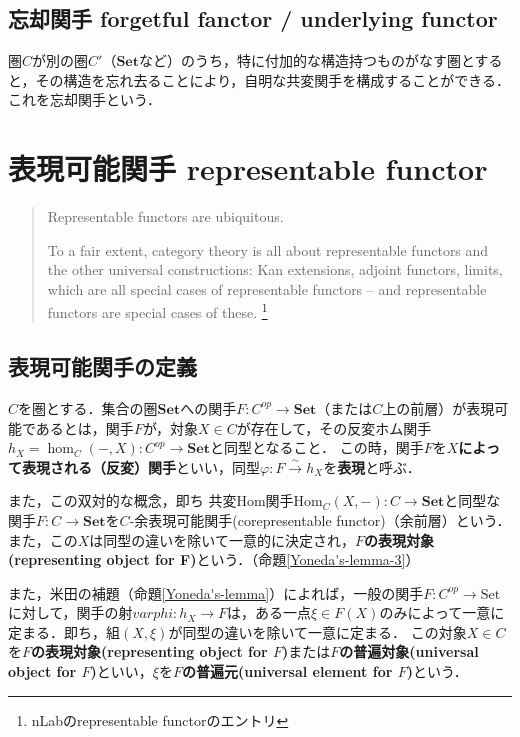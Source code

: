 \documentclass[uplatex, 12pt, dvipdfmx]{jsreport}
\begin{document}
\subsection{忘却関手 forgetful fanctor / underlying functor}
圏$C$が別の圏$C'$（$\mathbf{Set}$など）のうち，特に付加的な構造持つものがなす圏とすると，その構造を忘れ去ることにより，自明な共変関手を構成することができる．これを忘却関手という．

\section{表現可能関手 representable functor}
\begin{quotation}
    Representable functors are ubiquitous.
    
    To a fair extent, category theory is all about representable functors and the other universal constructions: Kan extensions, adjoint functors, limits, which are all special cases of representable functors – and representable functors are special cases of these.
    \footnote{nLabのrepresentable functorのエントリ}
\end{quotation}
\subsection{表現可能関手の定義}
\begin{shadebox}\begin{definition}[表現可能関手]\label{def-representable functor}
    $C$を圏とする．集合の圏$\mathbf{Set}$への関手$F:C^{op}\to\mathbf{Set}$（または$C$上の前層）が表現可能であるとは，関手$F$が，対象$X\in C$が存在して，その反変ホム関手$h_X=\hom_C(-,X):C^{op}\to\mathbf{Set}$と同型となること．
    この時，関手$F$を\textbf{$X$によって表現される（反変）関手}といい，同型$\varphi :F\xrightarrow{\sim}h_X$を\textbf{表現}と呼ぶ．
\end{definition}\end{shadebox}

また，この双対的な概念，即ち
共変Hom関手$\mathrm{Hom}_C(X,-):C\to\mathbf{Set}$と同型な関手$F:C\rightarrow \mathbf{Set}$を$C$-余表現可能関手(corepresentable functor)（余前層）という．
また，この$X$は同型の違いを除いて一意的に決定され，\textbf{$F$の表現対象(representing object for F)}という．（命題\ref{Yoneda's-lemma-3}）

また，米田の補題（命題\ref{Yoneda's-lemma}）によれば，一般の関手$F:C^{op}\to\mathrm{Set}$に対して，関手の射$varphi: h_X\to F$は，ある一点$\xi\in F(X)$のみによって一意に定まる．即ち，組$(X,\xi)$が同型の違いを除いて一意に定まる．
この対象$X\in C$を\textbf{$F$の表現対象(representing object for $F$)}または\textbf{$F$の普遍対象(universal object for $F$)}といい，$\xi$を\textbf{$F$の普遍元(universal element for $F$)}という．
\end{document}
